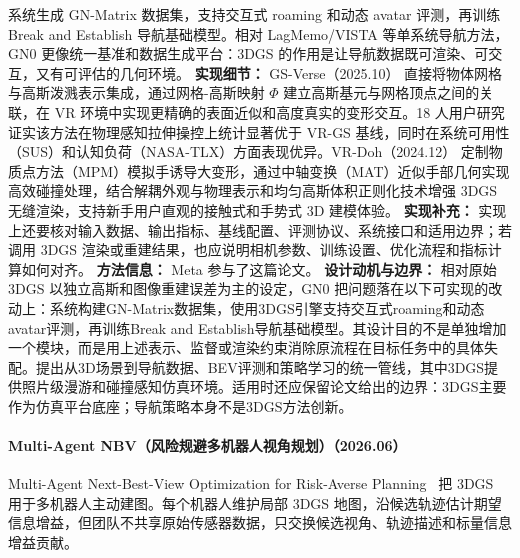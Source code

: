 系统生成 GN-Matrix 数据集，支持交互式 roaming 和动态 avatar 评测，再训练 Break and Establish 导航基础模型。相对 LagMemo/VISTA 等单系统导航方法，GN0 更像统一基准和数据生成平台：3DGS 的作用是让导航数据既可渲染、可交互，又有可评估的几何环境。
\textbf{实现细节：} GS-Verse（2025.10） 直接将物体网格与高斯泼溅表示集成，通过网格-高斯映射 $\Phi$ 建立高斯基元与网格顶点之间的关联，在 VR 环境中实现更精确的表面近似和高度真实的变形交互。18 人用户研究证实该方法在物理感知拉伸操控上统计显著优于 VR-GS 基线，同时在系统可用性（SUS）和认知负荷（NASA-TLX）方面表现优异。VR-Doh（2024.12） 定制物质点方法（MPM）模拟手诱导大变形，通过中轴变换（MAT）近似手部几何实现高效碰撞处理，结合解耦外观与物理表示和均匀高斯体积正则化技术增强 3DGS 无缝渲染，支持新手用户直观的接触式和手势式 3D 建模体验。
\textbf{实现补充：} 实现上还要核对输入数据、输出指标、基线配置、评测协议、系统接口和适用边界；若调用 3DGS 渲染或重建结果，也应说明相机参数、训练设置、优化流程和指标计算如何对齐。
\textbf{方法信息：} Meta 参与了这篇论文。
\textbf{设计动机与边界：} 相对原始 3DGS 以独立高斯和图像重建误差为主的设定，GN0 把问题落在以下可实现的改动上：系统构建GN-Matrix数据集，使用3DGS引擎支持交互式roaming和动态avatar评测，再训练Break and Establish导航基础模型。其设计目的不是单独增加一个模块，而是用上述表示、监督或渲染约束消除原流程在目标任务中的具体失配。提出从3D场景到导航数据、BEV评测和策略学习的统一管线，其中3DGS提供照片级漫游和碰撞感知仿真环境。适用时还应保留论文给出的边界：3DGS主要作为仿真平台底座；导航策略本身不是3DGS方法创新。
\paragraph{Multi-Agent NBV（风险规避多机器人视角规划）（2026.06）}
Multi-Agent Next-Best-View Optimization for Risk-Averse Planning~\cite{2606_04158} 把 3DGS 用于多机器人主动建图。每个机器人维护局部 3DGS 地图，沿候选轨迹估计期望信息增益，但团队不共享原始传感器数据，只交换候选视角、轨迹描述和标量信息增益贡献。


